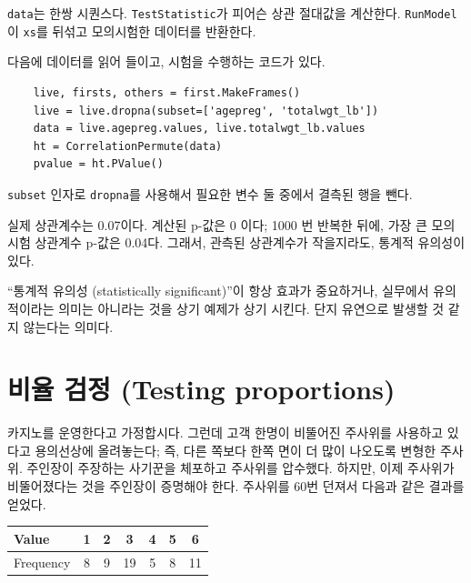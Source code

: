 {\tt data}는 한쌍 시퀀스다. {\tt TestStatistic}가 피어슨 상관 절대값을 계산한다. {\tt RunModel}이 {\tt xs}를 뒤섞고 모의시험한 데이터를 반환한다.

다음에 데이터를 읽어 들이고, 시험을 수행하는 코드가 있다.

\begin{verbatim}
    live, firsts, others = first.MakeFrames()
    live = live.dropna(subset=['agepreg', 'totalwgt_lb'])
    data = live.agepreg.values, live.totalwgt_lb.values
    ht = CorrelationPermute(data)
    pvalue = ht.PValue()
\end{verbatim}

{\tt subset} 인자로 {\tt dropna}를 사용해서 필요한 변수 둘 중에서 결측된 행을 뺀다.

실제 상관계수는 0.07이다. 계산된 p-값은 0 이다; 1000 번 반복한 뒤에, 가장 큰 모의 시험 상관계수 p-값은 0.04다. 그래서, 관측된 상관계수가 작을지라도, 통계적 유의성이 있다.

``통계적 유의성 (statistically significant)''이 항상 효과가 중요하거나, 실무에서 유의적이라는 의미는 아니라는 것을 상기 예제가 상기 시킨다.
단지 유연으로 발생할 것 같지 않는다는 의미다.

\section{비율 검정 (Testing proportions)}
\label{casino}

카지노를 운영한다고 가정합시다. 그런데 고객 한명이 비뚤어진 주사위를 사용하고 있다고 용의선상에 올려놓는다; 즉, 다른 쪽보다 한쪽 면이 더 많이 나오도록 변형한 주사위. 주인장이 주장하는 사기꾼을 체포하고 주사위를 압수했다. 하지만, 이제 주사위가 비뚤어졌다는 것을 주인장이 증명해야 한다.
주사위를 60번 던져서 다음과 같은 결과를 얻었다.

\begin{center}
\begin{tabular}{|l|c|c|c|c|c|c|}
\hline
Value     &  1  &  2  &  3  &  4  &  5  &  6  \\ 
\hline
Frequency &  8  &  9  &  19  &  5  &  8  &  11  \\
\hline
\end{tabular}
\end{center}

